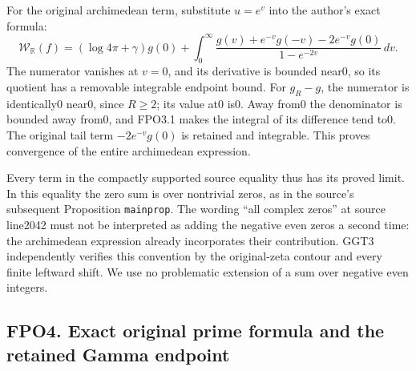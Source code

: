 For the original archimedean term, substitute \(u=e^v\) into the
author's exact formula: \[
\mathcal W_{\mathbb R}(f)=
 (\log4\pi+\gamma)g(0)+
 \int_0^\infty
 \frac{g(v)+e^{-v}g(-v)-2e^{-v}g(0)}{1-e^{-2v}}\,dv.
\tag{FPO3.3}
\] The numerator vanishes at \(v=0\), and its derivative is bounded
near0, so its quotient has a removable integrable endpoint bound. For
\(g_R-g\), the numerator is identically0 near0, since \(R\ge2\); its
value at0 is0. Away from0 the denominator is bounded away from0, and
FPO3.1 makes the integral of its difference tend to0. The original tail
term \(-2e^{-v}g(0)\) is retained and integrable. This proves
convergence of the entire archimedean expression.

Every term in the compactly supported source equality thus has its
proved limit. In this equality the zero sum is over nontrivial zeros, as
in the source's subsequent Proposition \texttt{mainprop}. The wording
``all complex zeros'' at source line2042 must not be interpreted as
adding the negative even zeros a second time: the archimedean expression
already incorporates their contribution. GGT3 independently verifies
this convention by the original-zeta contour and every finite leftward
shift. We use no problematic extension of a sum over negative even
integers.

\subsection{FPO4. Exact original prime formula and the retained Gamma
endpoint}\label{fpo4.-exact-original-prime-formula-and-the-retained-gamma-endpoint}

